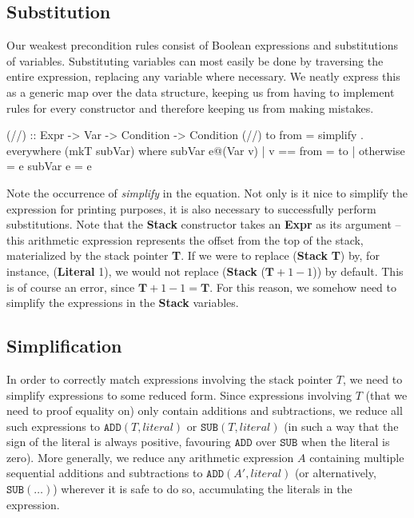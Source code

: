 \documentclass[a4paper]{article}
\begin{document}
\subsection{Substitution}
Our weakest precondition rules consist of Boolean expressions and substitutions of variables. Substituting variables can most easily be done by traversing the entire expression, replacing any variable where necessary. We neatly express this as a generic map over the data structure, keeping us from having to implement rules for every constructor and therefore keeping us from making mistakes.

\begin{haskell}
(//) :: Expr -> Var -> Condition -> Condition
(//) to from = simplify . everywhere (mkT subVar)
  where
    subVar e@(Var v) | v == from = to
                     | otherwise = e
    subVar e = e
\end{haskell}

Note the occurrence of \textit{simplify} in the equation. Not only is it nice to simplify the expression for printing purposes, it is also necessary to successfully perform substitutions. Note that the \textbf{Stack} constructor takes an \textbf{Expr} as its argument -- this arithmetic expression represents the offset from the top of the stack, materialized by the stack pointer \textbf{T}. If we were to replace (\textbf{Stack} \textbf{T}) by, for instance, (\textbf{Literal} 1), we would not replace (\textbf{Stack} ($\mathbf{T} + 1 - 1$)) by default. This is of course an error, since $\mathbf{T} + 1 - 1 = \mathbf{T}$. For this reason, we somehow need to simplify the expressions in the \textbf{Stack} variables.

\subsection{Simplification}
In order to correctly match expressions involving the stack pointer $T$, we need to simplify expressions to some reduced form. Since expressions involving $T$ (that we need to proof equality on) only contain additions and subtractions, we reduce all such expressions to $\mathtt{ADD}(T, \mathit{literal})$ or $\mathtt{SUB}(T, \mathit{literal})$ (in such a way that the sign of the literal is always positive, favouring $\mathtt{ADD}$ over $\mathtt{SUB}$ when the literal is zero). More generally, we reduce any arithmetic expression $A$ containing multiple sequential additions and subtractions to $\mathtt{ADD}(A', \mathit{literal})$ (or alternatively, $\mathtt{SUB}(\ldots)$) wherever it is safe to do so, accumulating the literals in the expression.
\end{document}
